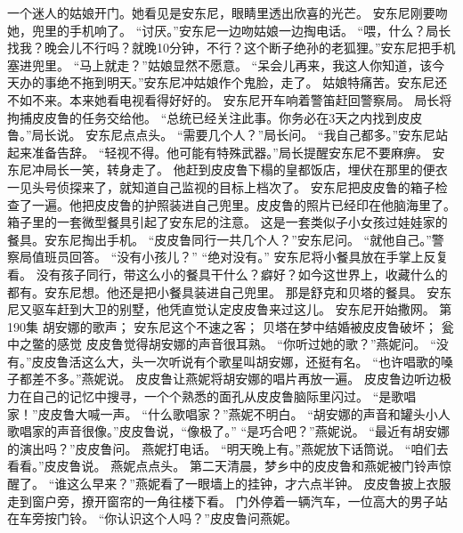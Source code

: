 \documentclass[a4paper,12pt,UTF8,twoside]{ctexbook}
\begin{document}
        一个迷人的姑娘开门。她看见是安东尼，眼睛里透出欣喜的光芒。 
        安东尼刚要吻她，兜里的手机响了。 
        “讨厌。”安东尼一边吻姑娘一边掏电话。 
        “喂，什么？局长找我？晚会儿不行吗？就晚10分钟，不行？这个断子绝孙的老狐狸。”安东尼把手机塞进兜里。 
        “马上就走？”姑娘显然不愿意。 
        “呆会儿再来，我这人你知道，该今天办的事绝不拖到明天。”安东尼冲姑娘作个鬼脸，走了。 
        姑娘特痛苦。安东尼还不如不来。本来她看电视看得好好的。 
        安东尼开车响着警笛赶回警察局。 
        局长将拘捕皮皮鲁的任务交给他。 
        “总统已经关注此事。你务必在3天之内找到皮皮鲁。”局长说。 
        安东尼点点头。 
        “需要几个人？”局长问。 
        “我自己都多。”安东尼站起来准备告辞。 
        “轻视不得。他可能有特殊武器。”局长提醒安东尼不要麻痹。 
        安东尼冲局长一笑，转身走了。 
        他赶到皮皮鲁下榻的皇都饭店，埋伏在那里的便衣一见头号侦探来了，就知道自己监视的目标上档次了。 
        安东尼把皮皮鲁的箱子检查了一遍。他把皮皮鲁的护照装进自己兜里。皮皮鲁的照片已经印在他脑海里了。 
        箱子里的一套微型餐具引起了安东尼的注意。 
        这是一套类似子小女孩过娃娃家的餐具。安东尼掏出手机。 
        “皮皮鲁同行一共几个人？”安东尼问。 
        “就他自己。”警察局值班员回答。 
        “没有小孩儿？” 
        “绝对没有。” 
        安东尼将小餐具放在手掌上反复看。 
        没有孩子同行，带这么小的餐具干什么？癖好？如今这世界上，收藏什么的都有。安东尼想。他还是把小餐具装进自己兜里。 
        那是舒克和贝塔的餐具。 
        安东尼又驱车赶到大卫的别墅，他凭直觉认定皮皮鲁来过这儿。 
        安东尼开始撒网。   第190集 
        胡安娜的歌声； 
        安东尼这个不速之客； 
        贝塔在梦中结婚被皮皮鲁破坏； 
        瓮中之鳖的感觉   
        皮皮鲁觉得胡安娜的声音很耳熟。 
        “你听过她的歌？”燕妮问。 
        “没有。”皮皮鲁活这么大，头一次听说有个歌星叫胡安娜，还挺有名。 
        “也许唱歌的嗓子都差不多。”燕妮说。 
        皮皮鲁让燕妮将胡安娜的唱片再放一遍。 
        皮皮鲁边听边极力在自己的记忆中搜寻，一个个熟悉的面孔从皮皮鲁脑际里闪过。 
        “是歌唱家！”皮皮鲁大喊一声。 
        “什么歌唱家？”燕妮不明白。 
        “胡安娜的声音和罐头小人歌唱家的声音很像。”皮皮鲁说，“像极了。” 
        “是巧合吧？”燕妮说。 
        “最近有胡安娜的演出吗？”皮皮鲁问。 
        燕妮打电话。 
        “明天晚上有。”燕妮放下话筒说。 
        “咱们去看看。”皮皮鲁说。 
        燕妮点点头。 
        第二天清晨，梦乡中的皮皮鲁和燕妮被门铃声惊醒了。 
        “谁这么早来？”燕妮看了一眼墙上的挂钟，才六点半钟。 
        皮皮鲁披上衣服走到窗户旁，撩开窗帘的一角往楼下看。 
        门外停着一辆汽车，一位高大的男子站在车旁按门铃。 
        “你认识这个人吗？”皮皮鲁问燕妮。 
\end{document}
